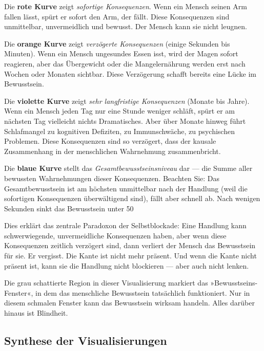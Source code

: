 \documentclass[12pt,a4paper]{article}
\begin{document}
Die \textbf{rote Kurve} zeigt \textit{sofortige Konsequenzen}. Wenn ein Mensch seinen Arm fallen lässt, spürt er sofort den Arm, der fällt. Diese Konsequenzen sind unmittelbar, unvermeidlich und bewusst. Der Mensch kann sie nicht leugnen.

Die \textbf{orange Kurve} zeigt \textit{verzögerte Konsequenzen} (einige Sekunden bis Minuten). Wenn ein Mensch ungesundes Essen isst, wird der Magen sofort reagieren, aber das Übergewicht oder die Mangelernährung werden erst nach Wochen oder Monaten sichtbar. Diese Verzögerung schafft bereits eine Lücke im Bewusstsein.

Die \textbf{violette Kurve} zeigt \textit{sehr langfristige Konsequenzen} (Monate bis Jahre). Wenn ein Mensch jeden Tag nur eine Stunde weniger schläft, spürt er am nächsten Tag vielleicht nichts Dramatisches. Aber über Monate hinweg führt Schlafmangel zu kognitiven Defiziten, zu Immunschwäche, zu psychischen Problemen. Diese Konsequenzen sind so verzögert, dass der kausale Zusammenhang in der menschlichen Wahrnehmung zusammenbricht.

Die \textbf{blaue Kurve} stellt das \textit{Gesamtbewusstseinsniveau} dar — die Summe aller bewussten Wahrnehmungen dieser Konsequenzen. Beachten Sie: Das Gesamtbewusstsein ist am höchsten unmittelbar nach der Handlung (weil die sofortigen Konsequenzen überwältigend sind), fällt aber schnell ab. Nach wenigen Sekunden sinkt das Bewusstsein unter 50%

Dies erklärt das zentrale Paradoxon der Selbstblockade: Eine Handlung kann schwerwiegende, unvermeidliche Konsequenzen haben, aber wenn diese Konsequenzen zeitlich verzögert sind, dann verliert der Mensch das Bewusstsein für sie. Er vergisst. Die Kante ist nicht mehr präsent. Und wenn die Kante nicht präsent ist, kann sie die Handlung nicht blockieren — aber auch nicht lenken.

Die grau schattierte Region in dieser Visualisierung markiert das »Bewusstseins-Fenster«, in dem das menschliche Bewusstsein tatsächlich funktioniert. Nur in diesem schmalen Fenster kann das Bewusstsein wirksam handeln. Alles darüber hinaus ist Blindheit.

\subsection{Synthese der Visualisierungen}
\end{document}
